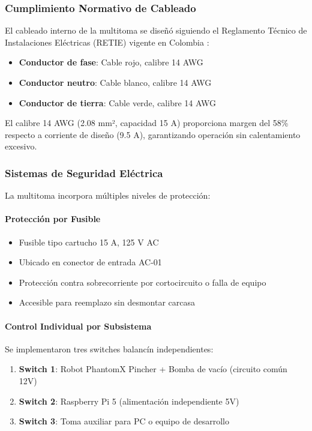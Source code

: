 \subsubsection{Cumplimiento Normativo de Cableado}

El cableado interno de la multitoma se diseñó siguiendo el Reglamento Técnico de Instalaciones Eléctricas (RETIE) vigente en Colombia \cite{RETIE2013}:

\begin{itemize}
    \item \textbf{Conductor de fase}: Cable rojo, calibre 14 AWG
    \item \textbf{Conductor neutro}: Cable blanco, calibre 14 AWG
    \item \textbf{Conductor de tierra}: Cable verde, calibre 14 AWG
\end{itemize}

El calibre 14 AWG (2.08 mm², capacidad 15 A) proporciona margen del 58\% respecto a corriente de diseño (9.5 A), garantizando operación sin calentamiento excesivo.

\subsubsection{Sistemas de Seguridad Eléctrica}

La multitoma incorpora múltiples niveles de protección:

\paragraph{Protección por Fusible}

\begin{itemize}
    \item Fusible tipo cartucho 15 A, 125 V AC
    \item Ubicado en conector de entrada AC-01
    \item Protección contra sobrecorriente por cortocircuito o falla de equipo
    \item Accesible para reemplazo sin desmontar carcasa
\end{itemize}

\paragraph{Control Individual por Subsistema}

Se implementaron tres switches balancín independientes:

\begin{enumerate}
    \item \textbf{Switch 1}: Robot PhantomX Pincher + Bomba de vacío (circuito común 12V)
    \item \textbf{Switch 2}: Raspberry Pi 5 (alimentación independiente 5V)
    \item \textbf{Switch 3}: Toma auxiliar para PC o equipo de desarrollo
\end{enumerate}

